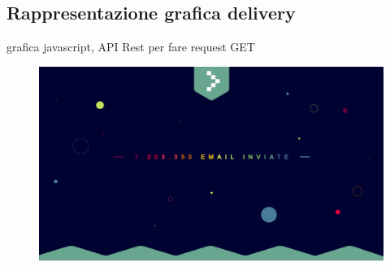 \documentclass[a4paper]{article}
\begin{document}
\subsection{Rappresentazione grafica delivery}
grafica javascript, API Rest per fare request GET
\begin{figure}[H]
	\includegraphics[width=\textwidth]{Monitor.jpg}
	\centering
\end{figure}
\end{document}
